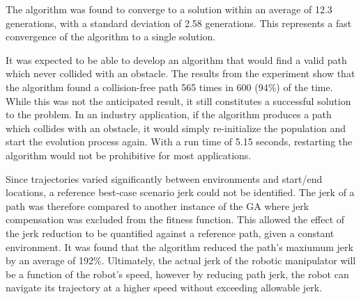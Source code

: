 The algorithm was found to converge to a solution within an average of 12.3 generations, with a standard deviation of 2.58 generations. This represents a fast convergence of the algorithm to a single solution.

It was expected to be able to develop an algorithm that would find a valid path which never collided with an obstacle. The results from the experiment show that the algorithm found a collision-free path 565 times in 600 (94\%) of the time. While this was not the anticipated result, it still constitutes a successful solution to the problem. In an industry application, if the algorithm produces a path which collides with an obstacle, it would simply re-initialize the population and start the evolution process again. With a run time of 5.15 seconds, restarting the algorithm would not be prohibitive for most applications.

Since trajectories varied significantly between environments and start/end locations, a reference best-case scenario jerk could not be identified. The jerk of a path was therefore compared to another instance of the GA where jerk compensation was excluded from the fitness function. This allowed the effect of the jerk reduction to be quantified against a reference path, given a constant environment. It was found that the algorithm reduced the path's maxiumum jerk by an average of 192\%. Ultimately, the actual jerk of the robotic manipulator will be a function of the robot's speed, however by reducing path jerk, the robot can navigate its trajectory at a higher speed without exceeding allowable jerk.